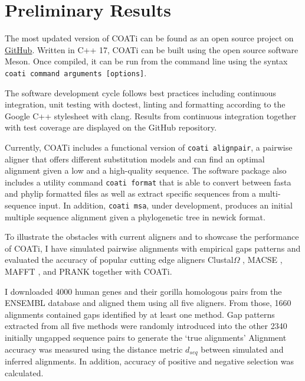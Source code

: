 \section{Preliminary Results}


The most updated version of COATi can be found as an open source project on
\href{https://www.github.com/jgarciamesa/coati}{GitHub}.
Written in C++ 17, COATi can be built using the open source software Meson.
Once compiled, it can be run from the command line using the syntax
\texttt{coati command arguments [options]}.

The software development cycle follows best practices including continuous
integration, unit testing with doctest, linting and formatting according to the
Google C++ stylesheet with clang.
Results from continuous integration together with test coverage are displayed
on the GitHub repository.

Currently, COATi includes a functional version of \texttt{coati alignpair}, a
pairwise aligner that offers different substitution models and can find an
optimal alignment given a low and a high-quality sequence.
The software package also includes a utility command \verb|coati format| that is
able to convert between fasta and phylip formatted files as well as extract
specific sequences from a multi-sequence input.
In addition, \texttt{coati msa}, under development, produces an initial multiple
sequence alignment given a phylogenetic tree in newick format.

To illustrate the obstacles with current aligners and to showcase the
performance of COATi, I have simulated pairwise alignments with empirical gaps
patterns and evaluated the accuracy of popular cutting edge aligners
Clustal$\Omega$ \parencite{clustal_omega_sievers_2011}, MACSE
\parencite{ranwez_macse_2011}, MAFFT \parencite{mafft_katoh_2002}, and PRANK
\parencite{prank_loytynoja_2014} together with COATi.

I downloaded 4000 human genes and their gorilla homologous pairs from the
ENSEMBL database \parencite{ensembl_hubbard_2002} and aligned them using all
five aligners.
From those, 1660 alignments contained gaps identified by at least one method.
Gap patterns extracted from all five methods were randomly introduced into the
other 2340 initially ungapped sequence pairs to generate the `true alignments'
Alignment accuracy was measured using the distance metric $d_{seq}$
\parencite{metrics_blackburne_whelan_2011} between simulated and inferred
alignments.
In addition, accuracy of positive and negative selection was calculated.%

